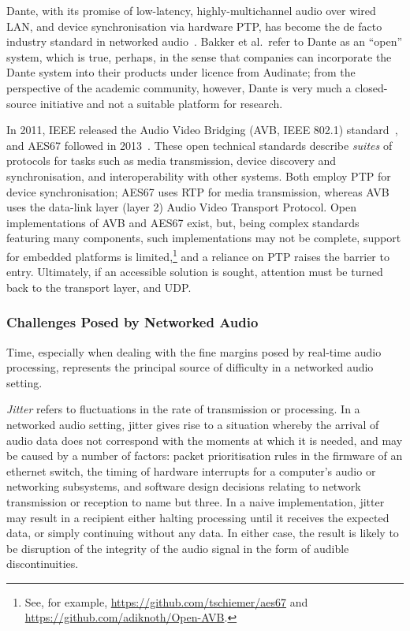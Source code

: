 \documentclass[utf8]{FrontiersinHarvard}
\begin{document}
    Dante, with its promise of low-latency, highly-multichannel audio over wired
    LAN, and device synchronisation via hardware PTP, has become the de facto
    industry standard in networked audio~\citep{bakker_introduction_2014}.
    Bakker et al.\ refer to Dante as an ``open'' system, which is true, perhaps,
    in the sense that companies can incorporate the Dante system into their
    products under licence from Audinate;
    from the perspective of the academic community, however, Dante is very much
    a closed-source initiative and not a suitable platform for research.

    In 2011, IEEE released the Audio Video Bridging (AVB, IEEE 802.1)
    standard~\citep{ieee_ieee_2011}, and AES67 followed in
    2013~\citep{hildebrand_aes67-2013_2014}.
    These open technical standards describe \textit{suites} of protocols for
    tasks such as media transmission, device discovery and
    synchronisation, and interoperability with other systems.
    Both employ PTP for device synchronisation; AES67 uses RTP for media
    transmission, whereas AVB uses the data-link layer (layer 2) Audio Video
    Transport Protocol.
    Open implementations of AVB and AES67 exist, but, being complex standards
    featuring many components, such implementations may not be complete, support
    for embedded platforms is limited,\footnote{
        See, for example, \url{https://github.com/tschiemer/aes67} and
        \url{https://github.com/adiknoth/Open-AVB}.
    } and a reliance on
    PTP raises the barrier to entry.
    Ultimately, if an accessible solution is sought, attention must be turned
    back to the transport layer, and UDP\@.

    \subsubsection{Challenges Posed by Networked Audio}\label{subsubsec:challenges}

    Time, especially when dealing with the fine margins posed by real-time audio
    processing, represents the principal source of difficulty in a networked
    audio setting.

    \textit{Jitter} refers to fluctuations in the rate of transmission or
    processing.
    In a networked audio setting, jitter gives rise to a situation whereby the
    arrival of audio data does not correspond with the moments at which it is
    needed, and may be caused by a number of factors: packet prioritisation
    rules in the firmware of an ethernet switch, the timing of hardware
    interrupts for a computer's audio or networking subsystems, and software
    design decisions relating to network transmission or reception to name but
    three.
    In a naive implementation, jitter may result in a recipient either halting
    processing until it receives the expected data, or simply continuing without
    any data.
    In either case, the result is likely to be disruption of the integrity of
    the audio signal in the form of audible discontinuities.
\end{document}
